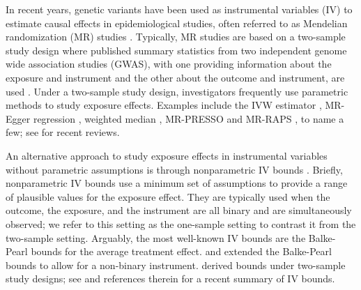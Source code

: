 \documentclass[AMA,STIX1COL,]{WileyNJD-v2}
\begin{document}
\label{introduction}

In recent years, genetic variants have been used as instrumental
variables (IV) to estimate causal effects in epidemiological studies,
often referred to as Mendelian randomization (MR) studies
\citep{davey_smith_mendelian_2003, lawlor_mendelian_2008, burgess_mendelian_2015}.
Typically, MR studies are based on a two-sample study design where
published summary statistics from two independent genome wide
association studies (GWAS), with one providing information about the
exposure and instrument and the other about the outcome and instrument,
are used
\citep{burgess_mendelian_2013, burgess_using_2015, davies_reading_2018}.
Under a two-sample study design, investigators frequently use parametric
methods to study exposure effects. Examples include the IVW estimator
\citep{burgess_mendelian_2013}, MR-Egger regression
\citep{bowden_assessing_2016}, weighted median
\citep{bowden_consistent_2016}, MR-PRESSO
\citep{verbanck_detection_2018} and MR-RAPS
\citep{zhao_statistical_2020}, to name a few; see
\citep{burgess_mendelian_2015, burgess_review_2017, slob_comparison_2020}
for recent reviews.

An alternative approach to study exposure effects in instrumental
variables without parametric assumptions is through nonparametric IV
bounds
\citep{balke_bounds_1997, cheng_bounds_2006, manski_nonparametric_1990, richardson_ace_2014, robins_analysis_1989}.
Briefly, nonparametric IV bounds use a minimum set of assumptions to
provide a range of plausible values for the exposure effect. They are
typically used when the outcome, the exposure, and the instrument are
all binary and are simultaneously observed; we refer to this setting as
the one-sample setting to contrast it from the two-sample setting.
Arguably, the most well-known IV bounds are the Balke-Pearl bounds
\citep{balke_bounds_1997} for the average treatment effect.
\citep{cheng_bounds_2006} and \citep{richardson_ace_2014} extended the
Balke-Pearl bounds to allow for a non-binary instrument.
\citep{ramsahai_causal_2012} derived bounds under two-sample study
designs; see \citep{swanson_partial_2018} and references therein for a
recent summary of IV bounds.
\end{document}
